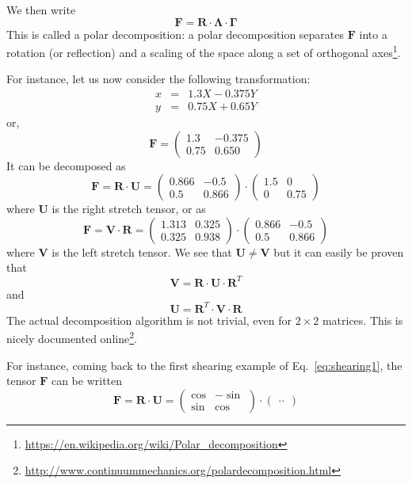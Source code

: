 We then write
\[
{\bm F} = {\bm R} \cdot {\bm \Lambda} \cdot {\bm \Gamma}
\] 
This is called a polar decomposition:
a polar decomposition separates ${\bm F}$ into a rotation (or reflection) and a scaling of 
the space along a set of orthogonal axes\footnote{\url{https://en.wikipedia.org/wiki/Polar_decomposition}}. 

For instance, let us now consider the following transformation:
\begin{eqnarray}
x &=& 1.3X-0.375Y\\ 
y &=& 0.75X+0.65 Y
\end{eqnarray}
or, 
\[
{\bm F} = 
\left(
\begin{array}{cc}
1.3 & -0.375 \\
0.75 & 0.650
\end{array}
\right)
\]
It can be decomposed as 
\[
{\bm F} = {\bm R} \cdot {\bm U}
=
\left(
\begin{array}{cc}
0.866 & -0.5 \\
0.5 & 0.866
\end{array}
\right)
\cdot
\left(
\begin{array}{cc}
1.5 & 0 \\
0 & 0.75
\end{array}
\right)
\]
where ${\bm U}$ is the right stretch tensor, or as 
\[
{\bm F} = {\bm V} \cdot {\bm R}
=
\left(
\begin{array}{cc}
1.313 & 0.325 \\
0.325 & 0.938 
\end{array}
\right)
\cdot
\left(
\begin{array}{cc}
0.866 & -0.5 \\
0.5 & 0.866
\end{array}
\right)
\]
where ${\bm V}$ is the left stretch tensor. 
We see that ${\bm U}\ne {\bm V}$ but it can 
easily be proven that 
\[
{\bm V} = {\bm R}\cdot{\bm U}\cdot {\bm R}^T
\]
and 
\[
{\bm U} = {\bm R}^T\cdot{\bm V}\cdot {\bm R}
\]
The actual decomposition algorithm is not trivial, 
even for $2\times2$ matrices. This is nicely documented 
online\footnote{\url{http://www.continuummechanics.org/polardecomposition.html}}.

For instance, coming back to the first shearing example of Eq.~\eqref{eq:shearing1}, 
the tensor ${\bm F}$ can be written 
\[
{\bm F}= {\bm R} \cdot {\bm U}
=
\left(
\begin{array}{cc}
\cos & -\sin \\
\sin & \cos 
\end{array}
\right)
\cdot
\left(
\begin{array}{cc}
.. 
\end{array}
\right)
\]

